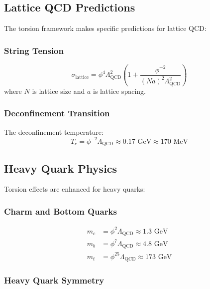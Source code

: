 \subsection{Lattice QCD Predictions}

The torsion framework makes specific predictions for lattice QCD:

\subsubsection{String Tension}

\begin{equation}
\sigma_{\text{lattice}} = \phi^4 \Lambda_{\text{QCD}}^2 \left(1 + \frac{\phi^{-2}}{(Na)^2 \Lambda_{\text{QCD}}^2}\right)
\end{equation}
where $N$ is lattice size and $a$ is lattice spacing.

\subsubsection{Deconfinement Transition}

The deconfinement temperature:
\begin{equation}
T_c = \phi^{-2} \Lambda_{\text{QCD}} \approx 0.17 \text{ GeV} \approx 170 \text{ MeV}
\end{equation}

\subsection{Heavy Quark Physics}

Torsion effects are enhanced for heavy quarks:

\subsubsection{Charm and Bottom Quarks}

\begin{align}
m_c &= \phi^2 \Lambda_{\text{QCD}} \approx 1.3 \text{ GeV} \\
m_b &= \phi^7 \Lambda_{\text{QCD}} \approx 4.8 \text{ GeV} \\
m_t &= \phi^{25} \Lambda_{\text{QCD}} \approx 173 \text{ GeV}
\end{align}

\subsubsection{Heavy Quark Symmetry}

